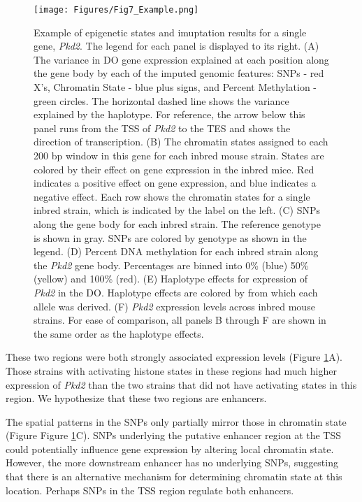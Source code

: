 \documentclass[
  11pt,
]{article}
\begin{document}
\begin{figure}[ht!]
\texttt{[image: Figures/Fig7\_Example.png]} 
\caption{Example of epigenetic states and imuptation results for a single 
gene, \textit{Pkd2}. The legend for each panel is displayed to its right.
(A) The variance in DO gene expression explained at 
each position along the gene body by each of the imputed genomic 
features: SNPs - red X's, Chromatin State - blue plus signs, and 
Percent Methylation - green circles. The horizontal dashed line shows 
the variance explained by the haplotype. For reference, the arrow 
below this panel runs from the TSS of \textit{Pkd2} to the TES and 
shows the direction of transcription. (B) The chromatin states assigned 
to each 200 bp window in this gene for each inbred mouse strain. States 
are colored by their effect on gene expression in the inbred mice. Red 
indicates a positive effect on gene expression, and blue indicates a 
negative effect. Each row shows the chromatin states for a single inbred 
strain, which is indicated by the label on the left. (C) SNPs along the 
gene body for each inbred strain. The reference genotype is shown in gray. 
SNPs are colored by genotype as shown in the legend. (D) Percent DNA 
methylation for each inbred strain along the \textit{Pkd2} gene body. 
Percentages are binned into 0\% (blue) 50\% (yellow) and 100\% (red). 
(E) Haplotype effects for expression of \textit{Pkd2} in the DO. 
Haplotype effects are colored by from which each allele was derived. 
(F) \textit{Pkd2} expression levels across inbred mouse strains. For 
ease of comparison, all panels B through F are shown in the same order 
as the haplotype effects.}
\label{fig:example_gene}
\end{figure}

These two regions were both strongly associated expression levels
(Figure \ref{fig:example_gene}A). Those strains with activating histone
states in these regions had much higher expression of \textit{Pkd2} than
the two strains that did not have activating states in this region. We
hypothesize that these two regions are enhancers.

The spatial patterns in the SNPs only partially mirror those in
chromatin state (Figure Figure \ref{fig:example_gene}C). SNPs underlying
the putative enhancer region at the TSS could potentially influence gene
expression by altering local chromatin state. However, the more
downstream enhancer has no underlying SNPs, suggesting that there is an
alternative mechanism for determining chromatin state at this location.
Perhaps SNPs in the TSS region regulate both enhancers.
\end{document}
